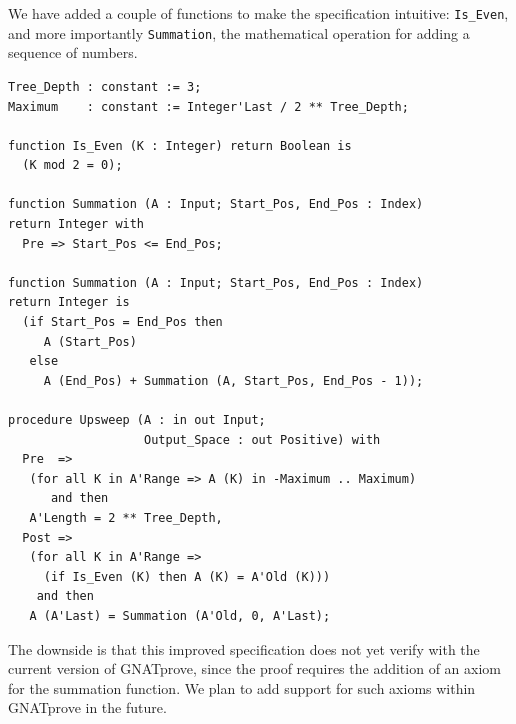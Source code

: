 \documentclass[sttt,final]{svjour}
\newcommand{\gnatprove}{GNATprove\xspace}
\newcommand{\oldspark}{SPARK~2005\xspace}
\newcommand{\newspark}{SPARK~2014\xspace}
\begin{document}
We have added a couple of functions to make the specification
intuitive: \verb|Is_Even|, and more importantly \verb|Summation|, the
mathematical operation for adding a sequence of numbers.
%
\begin{lstlisting}
Tree_Depth : constant := 3;
Maximum    : constant := Integer'Last / 2 ** Tree_Depth;

function Is_Even (K : Integer) return Boolean is
  (K mod 2 = 0);

function Summation (A : Input; Start_Pos, End_Pos : Index)
return Integer with
  Pre => Start_Pos <= End_Pos;

function Summation (A : Input; Start_Pos, End_Pos : Index)
return Integer is
  (if Start_Pos = End_Pos then
     A (Start_Pos)
   else
     A (End_Pos) + Summation (A, Start_Pos, End_Pos - 1));

procedure Upsweep (A : in out Input;
                   Output_Space : out Positive) with
  Pre  =>
   (for all K in A'Range => A (K) in -Maximum .. Maximum)
      and then
   A'Length = 2 ** Tree_Depth,
  Post =>
   (for all K in A'Range =>
     (if Is_Even (K) then A (K) = A'Old (K)))
    and then
   A (A'Last) = Summation (A'Old, 0, A'Last);
\end{lstlisting}
%

The downside is that this improved specification does not yet verify
with the current version of \gnatprove, since the proof requires
the addition of an axiom for the summation function. We plan
to add support for such axioms within \gnatprove in the future.



\end{document}
